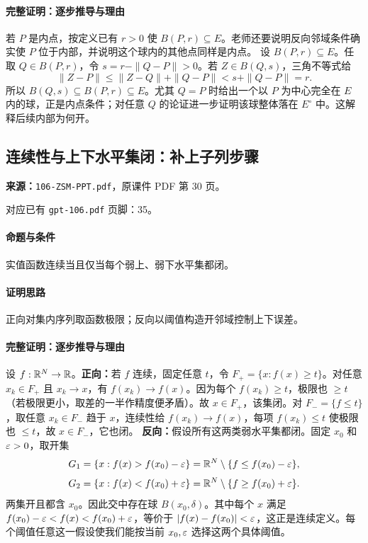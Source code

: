 \paragraph{完整证明：逐步推导与理由}

若 $P$ 是内点，按定义已有 $r>0$ 使 $B(P,r)\subseteq E$。老师还要说明反向邻域条件确实使 $P$ 位于内部，并说明这个球内的其他点同样是内点。
设 $B(P,r)\subseteq E$。任取 $Q\in B(P,r)$，令 $s=r-\|Q-P\|>0$。若 $Z\in B(Q,s)$，三角不等式给
\[\|Z-P\|\le\|Z-Q\|+\|Q-P\|<s+\|Q-P\|=r.\]
所以 $B(Q,s)\subseteq B(P,r)\subseteq E$。尤其 $Q=P$ 时给出一个以 $P$ 为中心完全在 $E$ 内的球，正是内点条件；对任意 $Q$ 的论证进一步证明该球整体落在 $E^\circ$ 中。这解释后续内部为何开。

\clearpage\subsection{连续性与上下水平集闭：补上子列步骤}
\textbf{来源：}\texttt{106-ZSM-PPT.pdf}，原课件 PDF 第 30 页。\par
对应已有 \texttt{gpt-106.pdf} 页脚：35。\par
\paragraph{命题与条件}实值函数连续当且仅当每个弱上、弱下水平集都闭。
\paragraph{证明思路}正向对集内序列取函数极限；反向以阈值构造开邻域控制上下误差。
\paragraph{完整证明：逐步推导与理由}

设 $f:\mathbb{R}^N\to\mathbb{R}$。\textbf{正向：}若 $f$ 连续，固定任意 $t$，令 $F_+=\{x:f(x)\ge t\}$。对任意 $x_k\in F_+$ 且 $x_k\to x$，有 $f(x_k)\to f(x)$。因为每个 $f(x_k)\ge t$，极限也 $\ge t$（若极限更小，取差的一半作精度便矛盾）。故 $x\in F_+$，该集闭。对 $F_-=\{f\le t\}$，取任意 $x_k\in F_-$ 趋于 $x$，连续性给 $f(x_k)\to f(x)$，每项 $f(x_k)\le t$ 使极限也 $\le t$，故 $x\in F_-$，它也闭。
\textbf{反向：}假设所有这两类弱水平集都闭。固定 $x_0$ 和 $\varepsilon>0$，取开集
\[G_1=\{x:f(x)>f(x_0)-\varepsilon\}=\mathbb{R}^N\setminus\{f\le f(x_0)-\varepsilon\},\]
\[G_2=\{x:f(x)<f(x_0)+\varepsilon\}=\mathbb{R}^N\setminus\{f\ge f(x_0)+\varepsilon\}.\]
两集开且都含 $x_0$。因此交中存在球 $B(x_0,\delta)$。其中每个 $x$ 满足 $f(x_0)-\varepsilon<f(x)<f(x_0)+\varepsilon$，等价于 $|f(x)-f(x_0)|<\varepsilon$，这正是连续定义。每个阈值任意这一假设使我们能按当前 $x_0,\varepsilon$ 选择这两个具体阈值。

